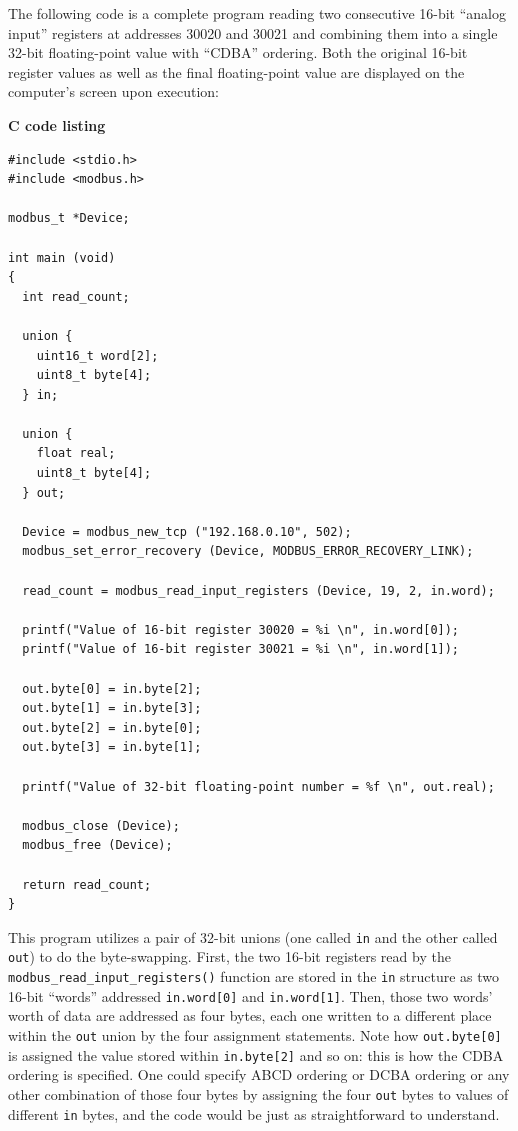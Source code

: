 The following code is a complete program reading two consecutive 16-bit ``analog input'' registers at addresses 30020 and 30021 and combining them into a single 32-bit floating-point value with ``CDBA'' ordering.  Both the original 16-bit register values as well as the final floating-point value are displayed on the computer's screen upon execution:

\vskip 10pt

\textbf{C code listing} 

\lstset{language=C}
\begin{lstlisting}
#include <stdio.h>
#include <modbus.h>

modbus_t *Device;

int main (void)
{
  int read_count;

  union {
    uint16_t word[2];
    uint8_t byte[4];
  } in;

  union {
    float real;
    uint8_t byte[4];
  } out;

  Device = modbus_new_tcp ("192.168.0.10", 502);
  modbus_set_error_recovery (Device, MODBUS_ERROR_RECOVERY_LINK);

  read_count = modbus_read_input_registers (Device, 19, 2, in.word);

  printf("Value of 16-bit register 30020 = %i \n", in.word[0]);
  printf("Value of 16-bit register 30021 = %i \n", in.word[1]);

  out.byte[0] = in.byte[2];
  out.byte[1] = in.byte[3];
  out.byte[2] = in.byte[0];
  out.byte[3] = in.byte[1];

  printf("Value of 32-bit floating-point number = %f \n", out.real);
  
  modbus_close (Device);
  modbus_free (Device);

  return read_count;
}
\end{lstlisting}

\filbreak

This program utilizes a pair of 32-bit unions (one called \texttt{in} and the other called \texttt{out}) to do the byte-swapping.  First, the two 16-bit registers read by the \texttt{modbus\_read\_input\_registers()} function are stored in the \texttt{in} structure as two 16-bit ``words'' addressed \texttt{in.word[0]} and \texttt{in.word[1]}.  Then, those two words' worth of data are addressed as four bytes, each one written to a different place within the \texttt{out} union by the four assignment statements.  Note how \texttt{out.byte[0]} is assigned the value stored within \texttt{in.byte[2]} and so on: this is how the CDBA ordering is specified.  One could specify ABCD ordering or DCBA ordering or any other combination of those four bytes by assigning the four \texttt{out} bytes to values of different \texttt{in} bytes, and the code would be just as straightforward to understand. 

